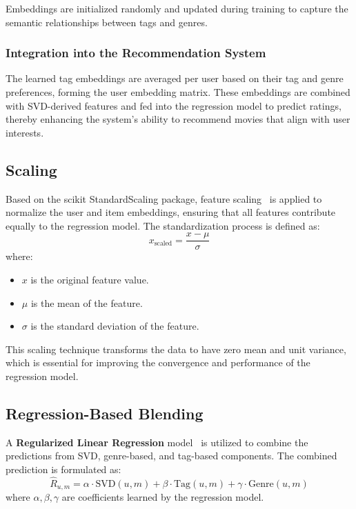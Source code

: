 \documentclass[nonacm, sigconf]{acmart}
\begin{document}
Embeddings are initialized randomly and updated during training to capture the semantic relationships between tags and genres.

\subsubsection{Integration into the Recommendation System}
The learned tag embeddings are averaged per user based on their tag and genre preferences, forming the user embedding matrix. These embeddings are combined with SVD-derived features and fed into the regression model to predict ratings, thereby enhancing the system's ability to recommend movies that align with user interests.


\subsection{Scaling}
Based on the scikit StandardScaling package, feature scaling~\cite{scikit_standard_scaler_docs, scikit_standard_scaler_github} is applied to normalize the user and item embeddings, ensuring that all features contribute equally to the regression model. The standardization process is defined as:
\begin{equation}
x_{\text{scaled}} = \frac{x - \mu}{\sigma}
\end{equation}
where:
\begin{itemize}
    \item $x$ is the original feature value.
    \item $\mu$ is the mean of the feature.
    \item $\sigma$ is the standard deviation of the feature.
\end{itemize}
This scaling technique transforms the data to have zero mean and unit variance, which is essential for improving the convergence and performance of the regression model.

\subsection{Regression-Based Blending}
A \textbf{Regularized Linear Regression} model~\cite{scikit_ridge_docs, scikit_ridge_github} is utilized to combine the predictions from SVD, genre-based, and tag-based components. The combined prediction is formulated as:
\begin{equation}
\hat{R}_{u,m} = \alpha \cdot \text{SVD}(u, m) + \beta \cdot \text{Tag}(u, m) + \gamma \cdot \text{Genre}(u, m)
\end{equation}
where $\alpha, \beta, \gamma$ are coefficients learned by the regression model.
\end{document}
